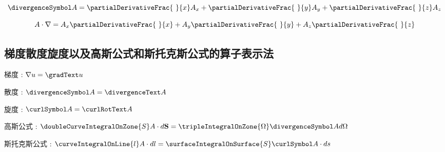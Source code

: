{{{{\begin{itemize}
{              $$
                \divergenceSymbol A = \partialDerivativeFrac{\ }{x}A_x + \partialDerivativeFrac{\ }{y}A_y + \partialDerivativeFrac{\ }{z}A_z
              $$

              $$
                A \cdot \nabla = A_x\partialDerivativeFrac{\ }{x} + A_y\partialDerivativeFrac{\ }{y} + A_z\partialDerivativeFrac{\ }{z}
              $$
              }
      \end{itemize}
    }%

    \subsection{梯度散度旋度以及高斯公式和斯托克斯公式的算子表示法}{
      梯度 : $\nabla u = \gradText u$

      散度 : $\divergenceSymbol A = \divergenceText A$

      旋度 : $\curlSymbol A = \curlRotText A$

      高斯公式 : $\doubleCurveIntegralOnZone{S} A \cdot d\mathbf{S} = \tripleIntegralOnZone{\Omega} \divergenceSymbol A d\Omega$

      斯托克斯公式 : $\curveIntegralOnLine{l} A \cdot dl = \surfaceIntegralOnSurface{S}\curlSymbol A \cdot ds$
    }%

}}}
